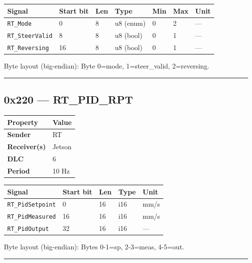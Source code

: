 \begin{longtable}[]{@{}lllllll@{}}
\toprule\noalign{}
Signal & Start bit & Len & Type & Min & Max & Unit \\
\midrule\noalign{}
\endhead
\bottomrule\noalign{}
\endlastfoot
\texttt{RT\_Mode} & 0 & 8 & u8 (enum) & 0 & 2 & --- \\
\texttt{RT\_SteerValid} & 8 & 8 & u8 (bool) & 0 & 1 & --- \\
\texttt{RT\_Reversing} & 16 & 8 & u8 (bool) & 0 & 1 & --- \\
\end{longtable}

Byte layout (big-endian): Byte 0=mode, 1=steer\_valid, 2=reversing.

\begin{center}\rule{0.5\linewidth}{0.5pt}\end{center}

\subsection{0x220 --- RT\_PID\_RPT}\label{x220-rt_pid_rpt}

\begin{longtable}[]{@{}ll@{}}
\toprule\noalign{}
Property & Value \\
\midrule\noalign{}
\endhead
\bottomrule\noalign{}
\endlastfoot
\textbf{Sender} & RT \\
\textbf{Receiver(s)} & Jetson \\
\textbf{DLC} & 6 \\
\textbf{Period} & 10 Hz \\
\end{longtable}

\begin{longtable}[]{@{}lllll@{}}
\toprule\noalign{}
Signal & Start bit & Len & Type & Unit \\
\midrule\noalign{}
\endhead
\bottomrule\noalign{}
\endlastfoot
\texttt{RT\_PidSetpoint} & 0 & 16 & i16 & mm/s \\
\texttt{RT\_PidMeasured} & 16 & 16 & i16 & mm/s \\
\texttt{RT\_PidOutput} & 32 & 16 & i16 & --- \\
\end{longtable}

Byte layout (big-endian): Bytes 0-1=sp, 2-3=meas, 4-5=out.

\begin{center}\rule{0.5\linewidth}{0.5pt}\end{center}

